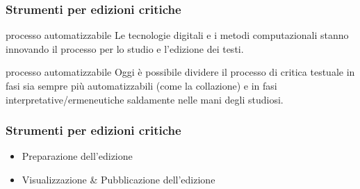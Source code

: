 %
%
%
%
%
%
%
%
%




\begin{frame}
	\frametitle{Strumenti per edizioni critiche}
	\addtocounter{nframe}{1}
    \begin{block}{processo automatizzabile}
       Le tecnologie digitali e i metodi computazionali stanno innovando il processo per lo studio e l'edizione dei testi.
    \end{block}
    \begin{block}{processo automatizzabile}
        Oggi è possibile dividere il processo di critica testuale in fasi sia sempre più automatizzabili (come la collazione) e in fasi interpretative/ermeneutiche saldamente nelle mani degli studiosi.
     \end{block}
	
\end{frame}

\begin{frame}
	\frametitle{Strumenti per edizioni critiche}
	\addtocounter{nframe}{1}
   
    \begin{center}
        \begin{itemize}
            \item Preparazione dell'edizione
            \item Visualizzazione & Pubblicazione dell'edizione
        \end{itemize}
    \end{center}
	
\end{frame}

